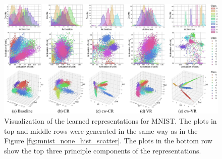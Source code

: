 \documentclass[letterpaper]{article} %
\begin{document}
\begin{figure}[t]
\centering
\centerline{\includegraphics[width=1\textwidth]{representation_characteristics.pdf}}
\caption{Visualization of the learned representations for MNIST. The plots in top and middle rows were generated in the same way as in the Figure \ref{fig:mnist_none_hist_scatter}. The plots in the bottom row show the top three principle components of the representations. 
}
\label{fig:representation}
\end{figure}
\end{document}
